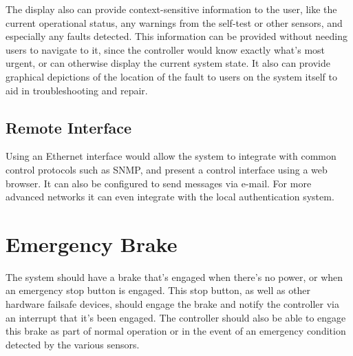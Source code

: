 \documentclass{article}
\begin{document}
The display also can provide context-sensitive information to the
user, like the current operational status, any warnings from the
self-test or other sensors, and especially any faults detected.
This information can be provided without needing users to navigate to
it, since the controller would know exactly what’s most urgent, or can
otherwise display the current system state. It also can provide
graphical depictions of the location of the fault to users on the
system itself to aid in troubleshooting and repair.

\subsection{Remote Interface}

Using an Ethernet interface would allow the system to integrate with
common control protocols such as SNMP, and present a control interface
using a web browser. It can also be configured to send messages via
e-mail. For more advanced networks it can even integrate with the
local authentication system.

\section{Emergency Brake}

The system should have a brake that’s engaged when there’s no power,
or when an emergency stop button is engaged. This stop button, as well
as other hardware failsafe devices, should engage the brake and notify
the controller via an interrupt that it’s been engaged. The controller
should also be able to engage this brake as part of normal operation
or in the event of an emergency condition detected by the
various sensors.
\end{document}
